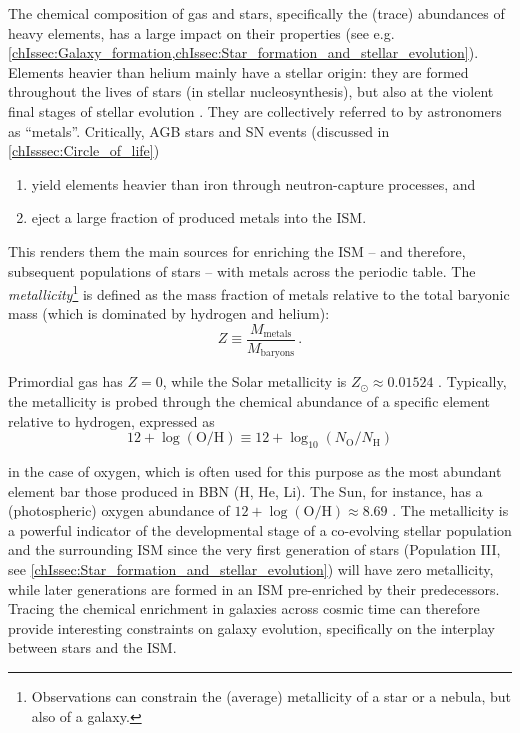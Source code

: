 The chemical composition of gas and stars, specifically the (trace) abundances of heavy elements, has a large impact on their properties (see e.g. \cref{chIssec:Galaxy_formation,chIssec:Star_formation_and_stellar_evolution}). Elements heavier than helium mainly have a stellar origin: they are formed throughout the lives of stars (in stellar nucleosynthesis), but also at the violent final stages of stellar evolution . They are collectively referred to by astronomers as ``metals''. Critically, AGB stars and SN events (discussed in \cref{chIsssec:Circle_of_life})
\begin{enumerate}[label=(\roman*)]
    \item yield elements heavier than iron through neutron-capture processes, and
    \item eject a large fraction of produced metals into the ISM.
\end{enumerate}

This renders them the main sources for enriching the ISM -- and therefore, subsequent populations of stars -- with metals across the periodic table. The \textit{metallicity}\footnote{Observations can constrain the (average) metallicity of a star or a nebula, but also of a galaxy.} is defined as the mass fraction of metals relative to the total baryonic mass (which is dominated by hydrogen and helium):
\begin{equation}
    \label{chIeq:Metallicity}
    Z \equiv \frac{M_\text{metals}}{M_\text{baryons}} \, .
\end{equation}

Primordial gas has $Z = 0$, while the Solar metallicity is $Z_\odot \approx 0.01524$ \citep[][; note that a fiducial value of $Z_\odot = 0.02$ is often adopted, however]{2012MNRAS.427..127B}. Typically, the metallicity is probed through the chemical abundance of a specific element relative to hydrogen, expressed as
\begin{equation}
    \label{chIeq:Oxygen_abundance}
    12 + \log \left( \mathrm{O/H} \right) \equiv 12 + \log_{10} \left( N_\text{O}/N_\text{H} \right)
\end{equation}

\noindent in the case of oxygen, which is often used for this purpose as the most abundant element bar those produced in BBN (H, He, Li). The Sun, for instance, has a (photospheric) oxygen abundance of $12 + \log \left( \mathrm{O/H} \right) \approx 8.69$ \citep{2009ARA&A..47..481A}. The metallicity is a powerful indicator of the developmental stage of a co-evolving stellar population and the surrounding ISM since the very first generation of stars (Population III, see \cref{chIssec:Star_formation_and_stellar_evolution}) will have zero metallicity, while later generations are formed in an ISM pre-enriched by their predecessors. Tracing the chemical enrichment in galaxies across cosmic time can therefore provide interesting constraints on galaxy evolution, specifically on the interplay between stars and the ISM.


